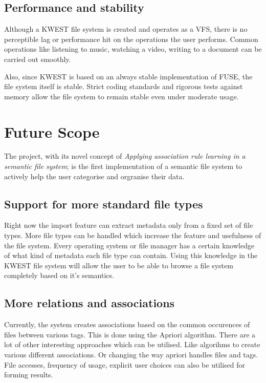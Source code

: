 \subsection*{Performance and stability}
Although a KWEST file system is created and operates as a VFS, there is no perceptible lag or performance hit on the operations the user performs. Common operations like listening to music, watching a video, writing to a document can be carried out smoothly.

Also, since KWEST is based on an always stable implementation of FUSE, the file system itself is stable. Strict coding standards and rigorous tests against memory allow the file system to remain stable even under moderate usage.


\section{Future Scope}

The project, with its novel concept of \textit{Applying association rule learning in a semantic file system}; is the first implementation of a semantic file system to actively help the user categorise and orgranise their data.

\subsection*{Support for more standard file types}
Right now the import feature can extract metadata only from a fixed set of file types. More file types can be handled which increase the feature and usefulness of the file system. Every operating system or file manager has a certain knowledge of what kind of metadata each file type can contain. Using this knowledge in the KWEST file system will allow the user to be able to browse a file system completely based on it's semantics.

\subsection*{More relations and associations}
Currently, the system creates associations based on the common occurences of files between various tags. This is done using the Apriori algorithm. There are a lot of other interesting approaches which can be utilised. Like algorihms to create various different associations. Or changing the way apriori handles files and tags. File accesses, frequency of usage, explicit user choices can also be utilised for forming results.

